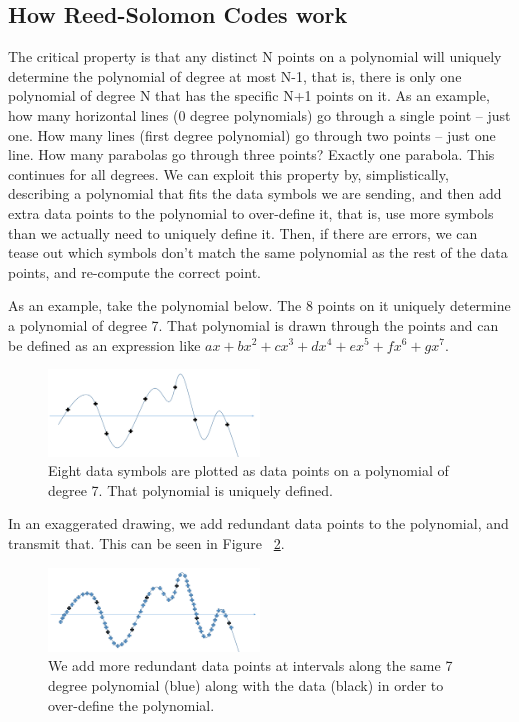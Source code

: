 \documentclass[12pt]{article}
\begin{document}
\subsection{How Reed-Solomon Codes work}

The critical property is that any distinct N points on a polynomial will uniquely determine the polynomial of degree at most N-1, that is, there is only one polynomial of degree N that has the specific N+1 points on it. As an example, how many horizontal lines (0 degree polynomials) go through a single point -- just one. How many lines (first degree polynomial) go through two points -- just one line. How many parabolas go through three points? Exactly one parabola. This continues for all degrees. We can exploit this property by, simplistically, describing a polynomial that fits the data symbols we are sending, and then add extra data points to the polynomial to over-define it, that is, use more symbols than we actually need to uniquely define it. Then, if there are errors, we can tease out which symbols don't match the same polynomial as the rest of the data points, and re-compute the correct point. \cite{tanenbaum}

As an example, take the polynomial below. The 8 points on it uniquely determine a polynomial of degree 7. That polynomial is drawn through the points and can be defined as an expression like $ax + bx^2 + cx^3 + dx^4 + ex^5 + fx^6 + gx^7$.

\begin{figure}[h!]
 \centering
 \includegraphics[width=0.5\textwidth]{img/poly1.png}
 \caption{Eight data symbols are plotted as data points on a polynomial of degree 7. That polynomial is uniquely defined.}
 \label{fig:poly1}
 \end{figure}

In an exaggerated drawing, we add redundant data points to the polynomial, and transmit that. This can be seen in Figure ~\ref{fig:poly2}.

\begin{figure}[h!]
 \centering
 \includegraphics[width=0.5\textwidth]{img/poly2.png}
 \caption{We add more redundant data points at intervals along the same 7 degree polynomial (blue) along with the data (black) in order to over-define the polynomial.}
 \label{fig:poly2}
 \end{figure}
\end{document}
